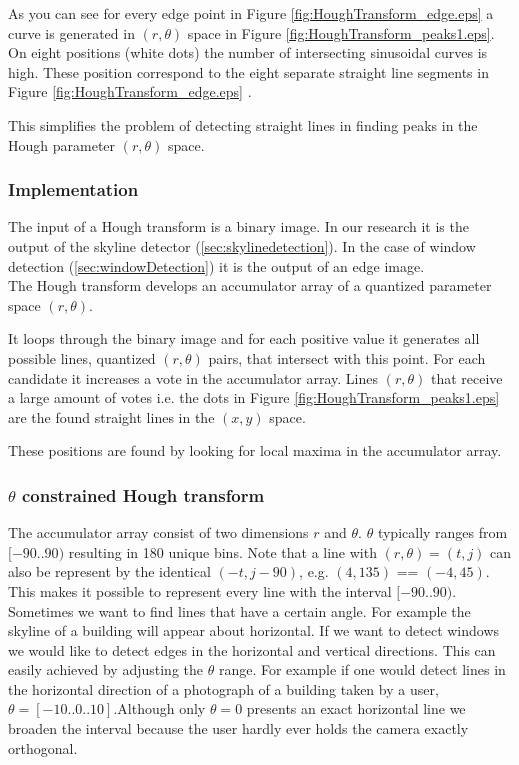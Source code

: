 	 
	 As you can see for every edge point 
	 in Figure \ref{fig:HoughTransform_edge.eps} 
	 a curve is generated in $(r,\theta)$ space in Figure 
\ref{fig:HoughTransform_peaks1.eps}.
	 On eight positions (white dots) the number of intersecting sinusoidal
	 curves is high. These position correspond to the eight separate straight
	 line segments in Figure \ref{fig:HoughTransform_edge.eps} .
	
	This simplifies the problem of detecting straight lines in finding peaks in the 
	Hough parameter $(r,\theta)$ space.

\subsubsection{Implementation}
	The input of a Hough transform is a binary image. In our research it is the output of 
	the skyline detector (\ref{sec:skylinedetection}). In the case of window
	detection (\ref{sec:windowDetection}) it is the output of an edge image.\\

	The Hough transform develops an accumulator array of a quantized parameter space $(r, \theta)$.

	It loops through the binary image and for each positive value 
	it generates all possible lines, quantized $(r, \theta)$ pairs, that intersect with this point.
	For each candidate it increases a vote in the accumulator array.
	Lines $(r, \theta)$ that receive a large amount of votes
	i.e. the dots in Figure \ref{fig:HoughTransform_peaks1.eps} are the found straight lines in the $(x,y)$ space.

	These positions are found by looking for local maxima in the accumulator array.

\subsubsection{$\theta$ constrained Hough transform}
The accumulator array consist of two dimensions $r$ and $\theta$.
$\theta$ typically ranges from $[-90..90)$ resulting in 180 unique bins.
Note that a line with $(r, \theta) = (t,j)$ can also be represent by the identical $(-t, j-90)$, e.g. $(4, 135)$ == $(-4, 45)$.
This makes it possible to represent every line with the interval $[-90..90)$.\\

Sometimes we want to find lines that have a certain angle.
For example the skyline of a building will appear about horizontal. If we
want to detect windows we would like to detect edges in the horizontal and vertical directions.
This can easily achieved by adjusting the $\theta$ range.
For example if one would detect lines in the horizontal direction of
a photograph of a building taken by a user, $\theta = [-10..0..10]$.Although
only $\theta = 0$ presents an exact horizontal line we broaden the interval
because the user hardly ever holds the camera exactly orthogonal.
	
